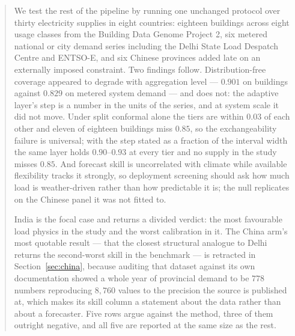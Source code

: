 \documentclass[10pt,a4paper]{article}
\begin{document}
\begin{abstract}
We test the rest of the pipeline by running one unchanged protocol over thirty
electricity supplies in eight countries: eighteen buildings across eight usage
classes from the Building Data Genome Project 2, six metered national or city
demand series including the Delhi State Load Despatch Centre and ENTSO-E, and
six Chinese provinces added late on an externally imposed constraint. Two
findings follow. Distribution-free coverage appeared to degrade with
aggregation level --- $0.901$ on buildings against $0.829$ on metered system
demand --- and does not: the adaptive layer's step is a number in the units of
the series, and at system scale it did not move. Under split conformal alone
the tiers are within $0.03$ of each other and eleven of eighteen buildings
miss $0.85$, so the exchangeability failure is universal; with the step stated
as a fraction of the interval width the same layer holds $0.90$--$0.93$ at
every tier and no supply in the study misses $0.85$. And forecast skill is
uncorrelated with climate while available flexibility tracks it strongly, so
deployment screening should ask how much load is weather-driven rather than how
predictable it is; the null replicates on the Chinese panel it was not fitted
to.

India is the focal case and returns a divided verdict: the most favourable load
physics in the study and the worst calibration in it. The China arm's most
quotable result --- that the closest structural analogue to Delhi returns the
second-worst skill in the benchmark --- is retracted in
Section~\ref{sec:china}, because auditing that dataset against its own
documentation showed a whole year of provincial demand to be $778$ numbers
reproducing $8{,}760$ values to the precision the source is published at, which
makes its skill column a statement
about the data rather than about a forecaster. Five rows argue against the
method, three of them outright negative, and all five are reported at the
same size as the rest.
\end{abstract}




















\end{document}
